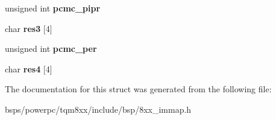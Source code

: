\begin{DoxyCompactItemize}
unsigned int {\bfseries pcmc\+\_\+pipr}
\item 
\mbox{\label{structpcmcia__conf_aa838e9d65a0a9ebc570df8cae4bc6042}} 
char {\bfseries res3} \mbox{[}4\mbox{]}
\item 
\mbox{\label{structpcmcia__conf_abefc10ad64ffde662dc493fa7b8ae733}} 
unsigned int {\bfseries pcmc\+\_\+per}
\item 
\mbox{\label{structpcmcia__conf_a9510b4a863f10db84ada7eabc2be4ef1}} 
char {\bfseries res4} \mbox{[}4\mbox{]}
\end{DoxyCompactItemize}


The documentation for this struct was generated from the following file\+:\begin{DoxyCompactItemize}
\item 
bsps/powerpc/tqm8xx/include/bsp/8xx\+\_\+immap.\+h\end{DoxyCompactItemize}

